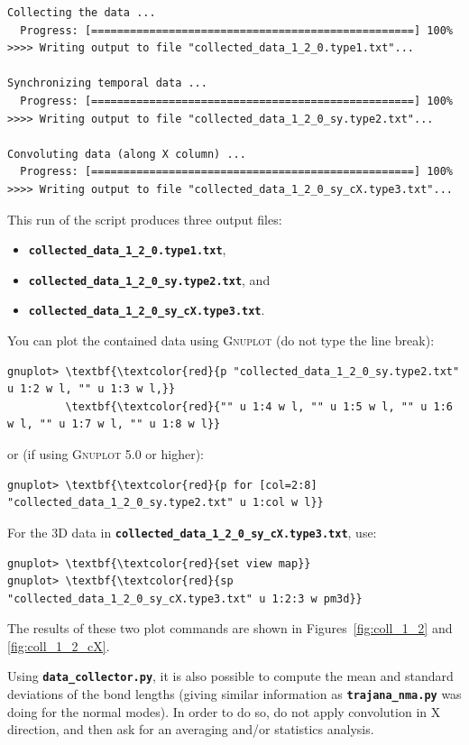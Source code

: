 \documentclass[a4paper,11pt,DIV=15,openany]{scrbook}
\newcommand{\ttt}[1]{\textbf{\texttt{#1}}}
\begin{document}
\begin{oframed}
\begin{Verbatim}[commandchars=\\\{\}]
Collecting the data ...
  Progress: [==================================================] 100%
>>>> Writing output to file "collected_data_1_2_0.type1.txt"...

Synchronizing temporal data ...
  Progress: [==================================================] 100%
>>>> Writing output to file "collected_data_1_2_0_sy.type2.txt"...

Convoluting data (along X column) ...
  Progress: [==================================================] 100%
>>>> Writing output to file "collected_data_1_2_0_sy_cX.type3.txt"...
\end{Verbatim}
\end{oframed}

\normalsize
This run of the script produces three output files:
\begin{itemize}
  \item \ttt{collected\_data\_1\_2\_0.type1.txt},
  \item \ttt{collected\_data\_1\_2\_0\_sy.type2.txt}, and
  \item \ttt{collected\_data\_1\_2\_0\_sy\_cX.type3.txt}.
\end{itemize}
You can plot the contained data using \textsc{Gnuplot} (do not type the line break):
\begin{Verbatim}[commandchars=\\\{\}]
gnuplot> \textbf{\textcolor{red}{p "collected_data_1_2_0_sy.type2.txt" u 1:2 w l, "" u 1:3 w l,}}
         \textbf{\textcolor{red}{"" u 1:4 w l, "" u 1:5 w l, "" u 1:6 w l, "" u 1:7 w l, "" u 1:8 w l}}
\end{Verbatim}
or (if using \textsc{Gnuplot} 5.0 or higher):
\begin{Verbatim}[commandchars=\\\{\}]
gnuplot> \textbf{\textcolor{red}{p for [col=2:8] "collected_data_1_2_0_sy.type2.txt" u 1:col w l}}
\end{Verbatim}
For the 3D data in \ttt{collected\_data\_1\_2\_0\_sy\_cX.type3.txt}, use:
\begin{Verbatim}[commandchars=\\\{\}]
gnuplot> \textbf{\textcolor{red}{set view map}}
gnuplot> \textbf{\textcolor{red}{sp "collected_data_1_2_0_sy_cX.type3.txt" u 1:2:3 w pm3d}}
\end{Verbatim}
The results of these two plot commands are shown in Figures~\ref{fig:coll_1_2} and \ref{fig:coll_1_2_cX}.

Using \ttt{data\_collector.py}, it is also possible to compute the mean and standard deviations of the bond lengths (giving similar information as \ttt{trajana\_nma.py} was doing for the normal modes).
In order to do so, do not apply convolution in X direction, and then ask for an averaging and/or statistics analysis.
\end{document}
